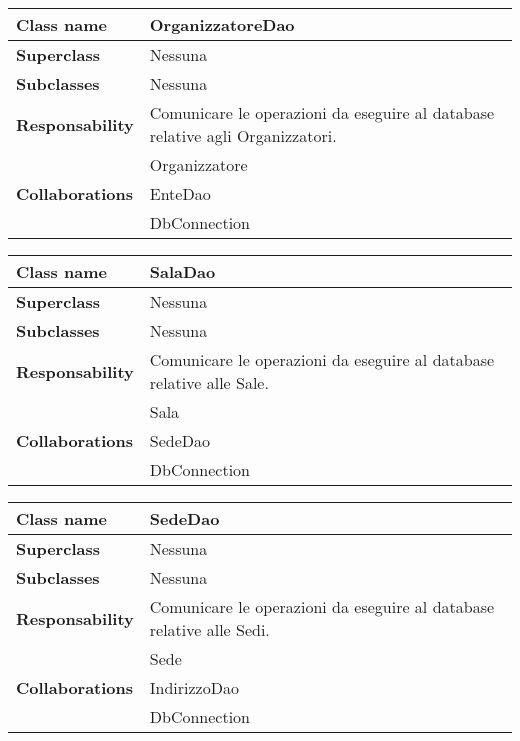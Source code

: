 \newpage
\begin{table}[h!]
	\begin{tabular}{|l|l|}
		\hline 
		\textbf{Class name} & OrganizzatoreDao
		\\ \hline
		\textbf{Superclass} & Nessuna
		\\ \hline
		\multirow{1}{*}{\textbf{Subclasses}} & Nessuna
		\\ \hline
		\textbf{Responsability} & Comunicare le operazioni da eseguire al database relative agli Organizzatori.
		\\ \hline
		\multirow{3}{*}{\textbf{Collaborations}} & Organizzatore \\ 
		& EnteDao \\
		& DbConnection \\ \hline
	\end{tabular}
\end{table}

\begin{table}[h!]
	\begin{tabular}{|l|l|}
		\hline 
		\textbf{Class name} & SalaDao
		\\ \hline
		\textbf{Superclass} & Nessuna
		\\ \hline
		\multirow{1}{*}{\textbf{Subclasses}} & Nessuna
		\\ \hline
		\textbf{Responsability} & Comunicare le operazioni da eseguire al database relative alle Sale.
		\\ \hline
		\multirow{3}{*}{\textbf{Collaborations}} & Sala \\ 
		& SedeDao \\
		& DbConnection \\ \hline
	\end{tabular}
\end{table}

\begin{table}[h!]
	\begin{tabular}{|l|l|}
		\hline 
		\textbf{Class name} & SedeDao
		\\ \hline
		\textbf{Superclass} & Nessuna
		\\ \hline
		\multirow{1}{*}{\textbf{Subclasses}} & Nessuna
		\\ \hline
		\textbf{Responsability} & Comunicare le operazioni da eseguire al database relative alle Sedi.
		\\ \hline
		\multirow{3}{*}{\textbf{Collaborations}} & Sede \\ 
		& IndirizzoDao \\
		& DbConnection \\ \hline
	\end{tabular}
\end{table}

